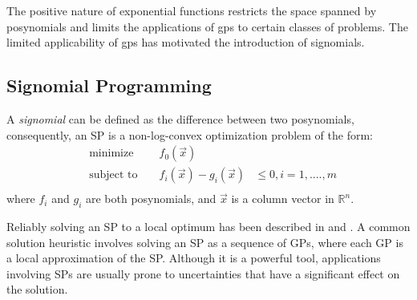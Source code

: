 The positive nature of exponential functions restricts the space spanned by posynomials and limits the applications of \gls{gp}s to certain classes of problems. The limited applicability of \gls{gp}s has motivated the introduction of signomials.

\subsection{Signomial Programming}
A {\em signomial} can be defined as the difference between two posynomials, consequently, an SP is a non-log-convex optimization problem of the form:
\begin{equation}
\begin{aligned}
&\text{minimize } && f_{0}(\vec{x}) \\
&\text{subject to } && f_{i}(\vec{x}) - g_{i}(\vec{x})& \leq 0, i = 1, ...., m \\
\end{aligned}
\end{equation} 
where $f_{i}$ and $g_{i}$ are both posynomials, and $\vec{x}$ is a column vector in $\mathbb{R}^n$. 

Reliably solving an SP to a local optimum has been described in \cite{Boyd2007} and \cite{Lipp2016}.
A common solution heuristic involves solving an SP as a sequence of GPs, where each GP is a local approximation of the SP.
Although it is a powerful tool, applications involving SPs are usually prone to uncertainties that have a significant effect on the solution.

